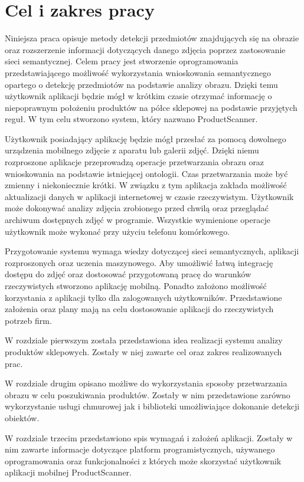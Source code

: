 \section{Cel i zakres pracy}
Niniejsza praca opisuje metody detekcji przedmiotów znajdujących się na obrazie oraz rozszerzenie informacji dotyczących danego zdjęcia poprzez zastosowanie sieci semantycznej. Celem pracy jest stworzenie oprogramowania przedstawiającego możliwość wykorzystania wnioskowania semantycznego opartego o detekcję przedmiotów na podstawie analizy obrazu. Dzięki temu użytkownik aplikacji będzie mógł w krótkim czasie otrzymać informację o niepoprawnym położeniu produktów na półce sklepowej na podstawie przyjętych reguł. W tym celu stworzono system, który nazwano ProductScanner.

Użytkownik posiadający aplikację będzie mógł przesłać za pomocą dowolnego urządzenia mobilnego zdjęcie z aparatu lub galerii zdjęć. Dzięki niemu rozproszone aplikacje przeprowadzą operacje przetwarzania obrazu oraz wnioskowania na podstawie istniejącej ontologii. Czas przetwarzania może być zmienny i niekoniecznie krótki. W związku z tym aplikacja zakłada możliwość aktualizacji danych w aplikacji internetowej w czasie rzeczywistym. Użytkownik może dokonywać analizy zdjęcia zrobionego przed chwilą oraz przeglądać archiwum dostępnych zdjęć w programie. Wszystkie wymienione operacje użytkownik może wykonać przy użyciu telefonu komórkowego.

Przygotowanie systemu wymaga wiedzy dotyczącej sieci semantycznych, aplikacji rozproszonych oraz uczenia maszynowego. Aby umożliwić łatwą integrację dostępu do zdjęć oraz dostosować przygotowaną pracę do warunków rzeczywistych stworzono aplikację mobilną. Ponadto założono możliwość korzystania z aplikacji tylko dla zalogowanych użytkowników. Przedstawione założenia oraz plany mają na celu dostosowanie aplikacji do rzeczywistych potrzeb firm.

W rozdziale pierwszym została przedstawiona idea realizacji systemu analizy produktów sklepowych. Zostały w niej zawarte cel oraz zakres realizowanych prac.

W rozdziale drugim opisano możliwe do wykorzystania sposoby przetwarzania obrazu w celu poszukiwania produktów. Zostały w nim przedstawione zarówno wykorzystanie usługi chmurowej jak i biblioteki umożliwiające dokonanie detekcji obiektów.

W rozdziale trzecim przedstawiono spis wymagań i założeń aplikacji. Zostały w nim zawarte informacje dotyczące platform programistycznych, używanego oprogramowania oraz funkcjonalności z których może skorzystać użytkownik aplikacji mobilnej ProductScanner.

